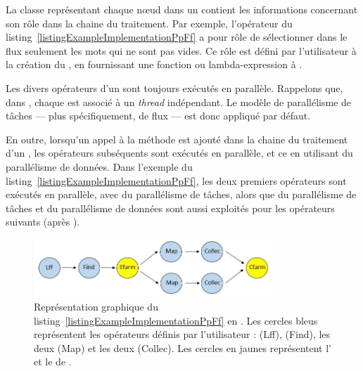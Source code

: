 La classe repr\'esentant chaque nœud dans un  contient les informations concernant son r\^ole dans la chaine du traitement. Par exemple, l'op\'erateur  du listing~\ref{listingExampleImplementationPpFf} a pour r\^ole de s\'electionner dans le flux seulement les mots qui ne sont pas vides. Ce r\^ole est d\'efini par l'utilisateur \`a la cr\'eation du , en fournissant une fonction ou lambda-expression \`a .


Les divers op\'erateurs d'un  sont toujours ex\'ecut\'es en parall\`ele.  Rappelons que, dans , chaque  est associ\'e \`a un \emph{thread} ind\'ependant. Le mod\`ele de parall\'elisme de t\^aches --- plus sp\'ecifiquement, de flux --- est donc appliqu\'e par d\'efaut. 

En outre, lorsqu'un appel \`a la m\'ethode  est ajout\'e dans la chaine du traitement d'un , les op\'erateurs subs\'equents sont ex\'ecut\'es en parall\`ele, et ce en utilisant du parall\'elisme de donn\'ees. Dans l'exemple du listing~\ref{listingExampleImplementationPpFf}, les deux premiers op\'erateurs sont ex\'ecut\'es en parall\`ele, avec du parall\'elisme de t\^aches, alors que du parall\'elisme de t\^aches et du parall\'elisme de donn\'ees sont aussi exploit\'es pour les op\'erateurs suivants (apr\`es ). 

\begin{figure}[ht]
\centering
     \includegraphics[width=0.8\textwidth]{Figures/ExempleRuntimeExecutionFF.jpg}
      \caption[Repr\'esentation graphique du listing~\ref{listingExampleImplementationPpFf} en .]{Repr\'esentation graphique du listing~\ref{listingExampleImplementationPpFf} en . Les cercles bleus repr\'esentent les op\'erateurs d\'efinis par l'utilisateur :  (Lff),  (Find), les deux  (Map) et les deux  (Collec). Les cercles en jaunes repr\'esentent l' et le  de .}
       \label{ExempleRuntimeExecutionFF.fig}
\end{figure}

